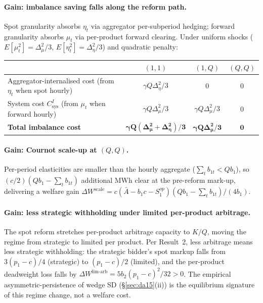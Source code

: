 \documentclass[11pt]{article}
\begin{document}
\paragraph{Gain: imbalance saving falls along the reform path.} Spot granularity absorbs $\eta_t$ via aggregator per-subperiod hedging; forward granularity absorbs $\mu_t$ via per-product forward clearing. Under uniform shocks ($E[\mu_t^2] = \Delta_\mu^2/3$, $E[\eta_t^2] = \Delta_\eta^2/3$) and quadratic penalty:
\begin{center}
\footnotesize
\begin{tabular}{l c c c}
\toprule
& $(1,1)$ & $(1,Q)$ & $(Q,Q)$ \\
\midrule
Aggregator-internalised cost (from $\eta_t$ when spot hourly) & $\gamma Q \Delta_\eta^2/3$ & $0$ & $0$ \\
System cost $C^I_{\text{sys}}$ (from $\mu_t$ when forward hourly) & $\gamma Q \Delta_\mu^2/3$ & $\gamma Q \Delta_\mu^2/3$ & $0$ \\
\textbf{Total imbalance cost} & $\boldsymbol{\gamma Q(\Delta_\mu^2+\Delta_\eta^2)/3}$ & $\boldsymbol{\gamma Q \Delta_\mu^2/3}$ & $\boldsymbol{0}$ \\
\bottomrule
\end{tabular}
\end{center}
\paragraph{Gain: Cournot scale-up at $(Q,Q)$.} Per-period elasticities are smaller than the hourly aggregate ($\sum_t b_{1t} < Q b_1$), so $(c/2)(Q b_1 - \sum_t b_{1t})$ additional MWh clear at the pre-reform mark-up, delivering a welfare gain $\Delta W^{\text{scale}} = c(\bar A - b_1 c - S^{op}_1)(Q b_1 - \sum_t b_{1t})/(4 b_1)$.

\paragraph{Gain: less strategic withholding under limited per-product arbitrage.} The spot reform stretches per-product arbitrage capacity to $K/Q$, moving the regime from strategic to limited per product. Per \citet{ito_reguant_2016} Result~2, less arbitrage means less strategic withholding: the strategic bidder's spot markup falls from $3(p_1-c)/4$ (strategic) to $(p_1-c)/2$ (limited), and the per-product deadweight loss falls by $\Delta W^{\text{lim-arb}} = 5 b_2(p_1-c)^2/32 > 0$. The empirical asymmetric-persistence of wedge SD (\S\ref{sec:da15}(ii)) is the equilibrium signature of this regime change, not a welfare cost.
\end{document}
